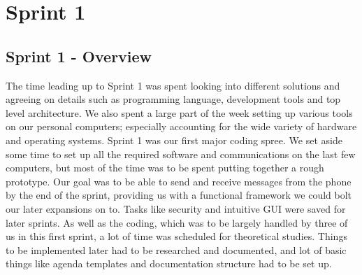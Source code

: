 \chapter{Sprint 1}

\section{Sprint 1 - Overview}
The time leading up to Sprint 1 was spent looking into different solutions and agreeing on details such as programming language, development tools and top level architecture. We also spent a large part of the week setting up various tools on our personal computers; especially accounting for the wide variety of hardware and operating systems.
\newline
\newline
Sprint 1 was our first major coding spree. We set aside some time to set up all the required software and communications on the last few computers, but most of the time was to be spent putting together a rough prototype. Our goal was to be able to send and receive messages from the phone by the end of the sprint, providing us with a functional framework we could bolt our later expansions on to. Tasks like security and intuitive GUI were saved for later sprints.
\newline
\newline
As well as the coding, which was to be largely handled by three of us in this first sprint, a lot of time was scheduled for theoretical studies. Things to be implemented later had to be researched and documented, and lot of basic things like agenda templates and documentation structure had to be set up.